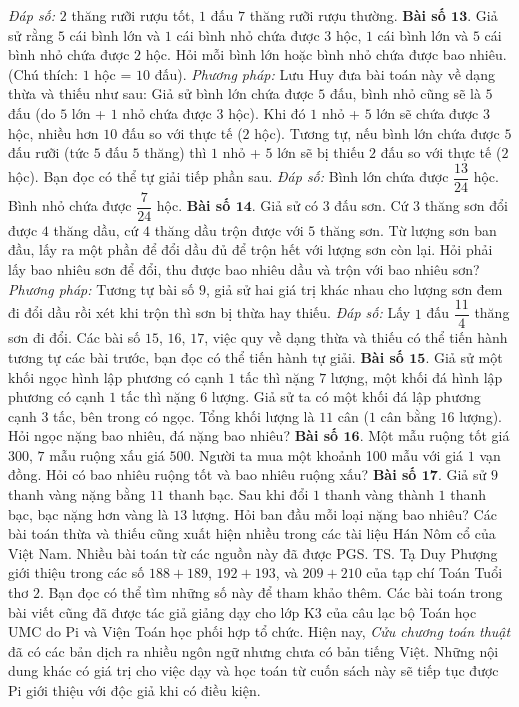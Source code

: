 \begin{multicols}{2}
	\vskip 0.1cm
	\textit{Đáp số:} $2$ thăng rưỡi rượu tốt, $1$ đấu $7$ thăng rưỡi rượu thường.
	\vskip 0.1cm
	\textbf{\color{diendantoanhoc}Bài số $\pmb{13.}$} Giả sử rằng $5$ cái bình lớn và $1$ cái bình nhỏ chứa được $3$ hộc, $1$ cái bình lớn và $5$ cái bình nhỏ chứa được $2$ hộc. Hỏi mỗi bình lớn hoặc bình nhỏ chứa được bao nhiêu. (Chú thích: $1$ hộc = $10$ đấu).
	\vskip 0.1cm
	\textit{Phương pháp:} Lưu Huy đưa bài toán này về dạng thừa và thiếu như sau:
	\vskip 0.1cm
	Giả sử bình lớn chứa được $5$ đấu, bình nhỏ cũng sẽ là $5$ đấu (do $5$ lớn + $1$ nhỏ chứa được $3$ hộc). Khi đó $1$ nhỏ + $5$ lớn sẽ chứa được $3$ hộc, nhiều hơn $10$ đấu so với thực tế ($2$ hộc).
	\vskip 0.1cm
	Tương tự, nếu bình lớn chứa được $5$ đấu rưỡi (tức $5$ đấu $5$ thăng) thì $1$ nhỏ + $5$ lớn sẽ bị thiếu $2$ đấu so với thực tế ($2$ hộc).
	\vskip 0.1cm
	Bạn đọc có thể tự giải tiếp phần sau.
	\vskip 0.1cm
	\textit{Đáp số:} Bình lớn chứa được $\dfrac{13}{24}$ hộc. Bình nhỏ chứa được $\dfrac{7}{24}$ hộc.
	\vskip 0.1cm
	\textbf{\color{diendantoanhoc}Bài số $\pmb{14.}$} Giả sử có $3$ đấu sơn. Cứ $3$ thăng sơn đổi được $4$ thăng dầu, cứ $4$ thăng dầu trộn được với $5$ thăng sơn. Từ lượng sơn ban đầu, lấy ra một phần để đổi dầu đủ để trộn hết với lượng sơn còn lại. Hỏi phải lấy bao nhiêu sơn để đổi, thu được bao nhiêu dầu và trộn với bao nhiêu sơn?
	\vskip 0.1cm
	\textit{Phương pháp:} Tương tự bài số $9$, giả sử hai giá trị khác nhau cho lượng sơn đem đi đổi dầu rồi xét khi trộn thì sơn bị thừa hay thiếu.
	\vskip 0.1cm
	\textit{Đáp số:} Lấy $1$ đấu $\dfrac{11}{4}$ thăng sơn đi đổi. 
	\vskip 0.1cm
	Các bài số $15$, $16$, $17$, việc quy về dạng thừa và thiếu có thể tiến hành tương tự các bài trước, bạn đọc có thể tiến hành tự giải.
	\vskip 0.1cm
	\textbf{\color{diendantoanhoc}Bài số $\pmb{15.}$} Giả sử một khối ngọc hình lập phương có cạnh $1$ tấc thì nặng $7$ lượng, một khối đá hình lập phương có cạnh $1$ tấc thì nặng $6$ lượng. Giả sử ta có một khối đá lập phương cạnh $3$ tấc, bên trong có ngọc. Tổng khối lượng là $11$ cân ($1$ cân bằng $16$ lượng). Hỏi ngọc nặng bao nhiêu, đá nặng bao nhiêu?
	\vskip 0.1cm
	\textbf{\color{diendantoanhoc}Bài số $\pmb{16.}$} Một mẫu ruộng tốt giá $300$, $7$ mẫu ruộng xấu giá $500$. Người ta mua một khoảnh 100 mẫu với giá $1$ vạn đồng. Hỏi có bao nhiêu ruộng tốt và bao nhiêu ruộng xấu?
	\vskip 0.1cm
	\textbf{\color{diendantoanhoc}Bài số $\pmb{17.}$} Giả sử $9$ thanh vàng nặng bằng $11$ thanh bạc. Sau khi đổi $1$ thanh vàng thành $1$ thanh bạc, bạc nặng hơn vàng là $13$ lượng. Hỏi ban đầu mỗi loại nặng bao nhiêu?
	\vskip 0.1cm
	Các bài toán thừa và thiếu cũng xuất hiện nhiều trong các tài liệu Hán Nôm cổ của Việt Nam. Nhiều bài toán từ các nguồn này đã được PGS. TS. Tạ Duy Phượng giới thiệu trong các số $188+189$, $192+193$, và $209+210$ của tạp chí Toán Tuổi thơ $2$. Bạn đọc có thể tìm những số này để tham khảo thêm. Các bài toán trong bài viết cũng đã được tác giả giảng dạy cho lớp K$3$ của câu lạc bộ Toán học UMC do Pi và Viện Toán học phối hợp tổ chức. Hiện nay, \textit{Cửu chương toán thuật} đã có các bản dịch ra nhiều ngôn ngữ nhưng chưa có bản tiếng Việt. Những nội dung khác có giá trị cho việc dạy và học toán từ cuốn sách này sẽ tiếp tục được Pi giới thiệu với độc giả khi có điều kiện.

\end{multicols}
